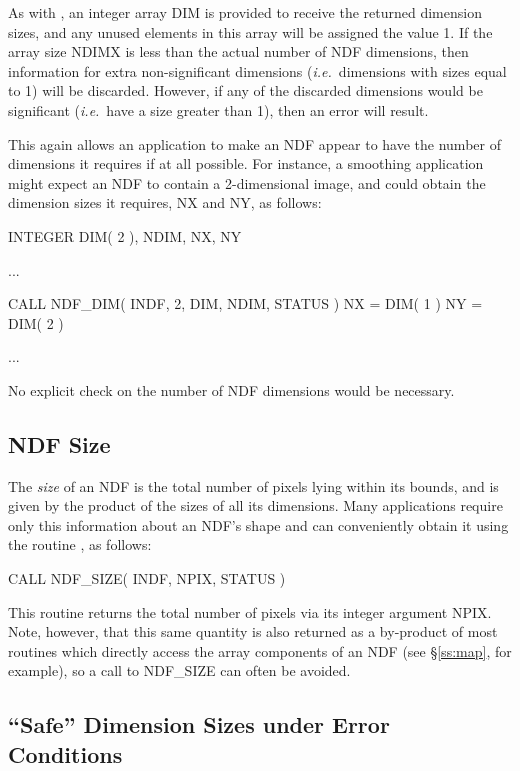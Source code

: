 \documentclass[twoside,11pt,nolof]{starlink}
\providecommand{\st}[1]{{\emph{#1}}}
\begin{document}
As with , an integer array DIM is provided to receive the returned
dimension sizes, and any unused elements in this array will be assigned the
value 1.
If the array size NDIMX is less than the actual number of NDF dimensions, then
information for extra non-significant dimensions (\st{i.e.}\ dimensions with
sizes equal to 1) will be discarded.
However, if any of the discarded dimensions would be significant
(\st{i.e.}\ have a size greater than 1), then an error will result.

This again allows an application to make an NDF appear to have the number
of dimensions it requires if at all possible.
For instance, a smoothing application might expect an NDF to contain a
2-dimensional image, and could obtain the dimension sizes it requires, NX
and NY, as follows:

\small
\begin{terminalv}
      INTEGER DIM( 2 ), NDIM, NX, NY

      ...

      CALL NDF_DIM( INDF, 2, DIM, NDIM, STATUS )
      NX = DIM( 1 )
      NY = DIM( 2 )

      ...
\end{terminalv}
\normalsize

No explicit check on the number of NDF dimensions would be necessary.

\subsection{NDF Size}

The \st{size\/} of an NDF is the total number of pixels lying within its
bounds, and is given by the product of the sizes of all its dimensions.
Many applications require only this information about an NDF's  shape and can
conveniently obtain it using the routine , as  follows:

\small
\begin{terminalv}
      CALL NDF_SIZE( INDF, NPIX, STATUS )
\end{terminalv}
\normalsize

This routine returns the total number of pixels via its integer argument
NPIX.
Note, however, that this same quantity is also returned as a by-product of most
routines which directly access the array components of an NDF (see
\S\ref{ss:map}, for example), so a call to NDF\_SIZE can often be avoided.

\subsection{\label{ss:safedimensions}``Safe'' Dimension Sizes under Error Conditions}
\end{document}
